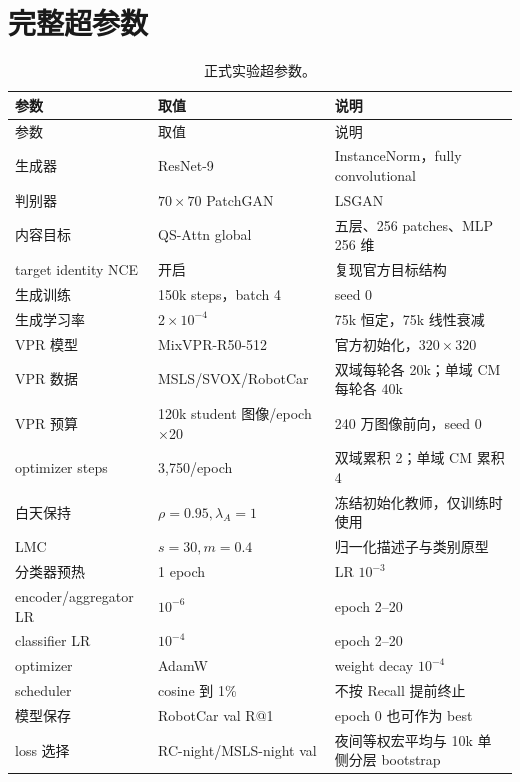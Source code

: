 \documentclass[UTF8,a4paper,11pt]{ctexart}
\begin{document}
\section{完整超参数}
\begin{longtable}{p{4.2cm}p{4.2cm}p{6.2cm}}
\caption{正式实验超参数。}\\
\toprule
参数 & 取值 & 说明\\
\midrule
\endfirsthead
\toprule
参数 & 取值 & 说明\\
\midrule
\endhead
生成器 & ResNet-9 & InstanceNorm，fully convolutional\\
判别器 & $70\times70$ PatchGAN & LSGAN\\
内容目标 & QS-Attn global & 五层、256 patches、MLP 256 维\\
target identity NCE & 开启 & 复现官方目标结构\\
生成训练 & 150k steps，batch 4 & seed 0\\
生成学习率 & $2\times10^{-4}$ & 75k 恒定，75k 线性衰减\\
VPR 模型 & MixVPR-R50-512 & 官方初始化，$320\times320$\\
VPR 数据 & MSLS/SVOX/RobotCar & 双域每轮各 20k；单域 CM 每轮各 40k\\
VPR 预算 & 120k student 图像/epoch$\times$20 & 240 万图像前向，seed 0\\
optimizer steps & 3,750/epoch & 双域累积 2；单域 CM 累积 4\\
白天保持 & $\rho=0.95,\lambda_A=1$ & 冻结初始化教师，仅训练时使用\\
LMC & $s=30,m=0.4$ & 归一化描述子与类别原型\\
分类器预热 & 1 epoch & LR $10^{-3}$\\
encoder/aggregator LR & $10^{-6}$ & epoch 2--20\\
classifier LR & $10^{-4}$ & epoch 2--20\\
optimizer & AdamW & weight decay $10^{-4}$\\
scheduler & cosine 到 1\% & 不按 Recall 提前终止\\
模型保存 & RobotCar val R@1 & epoch 0 也可作为 best\\
loss 选择 & RC-night/MSLS-night val & 夜间等权宏平均与 10k 单侧分层 bootstrap\\
\bottomrule
\end{longtable}
\end{document}
